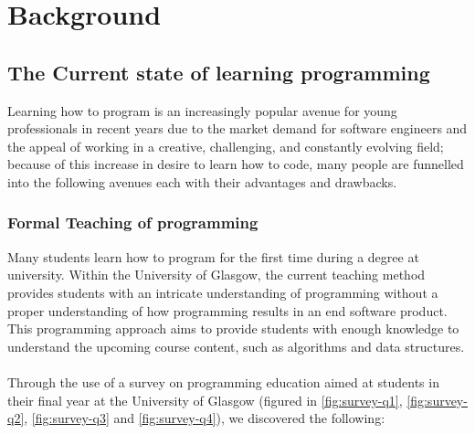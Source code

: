 \documentclass{l4proj}
\begin{document}
\chapter{Background} %

\section{The Current state of learning programming}

Learning how to program is an increasingly popular avenue for young professionals in recent years due to the market demand for software engineers and the appeal of working in a creative, challenging, and constantly evolving field; because of this increase in desire to learn how to code, many people are funnelled into the following avenues each with their advantages and drawbacks.

\subsection{Formal Teaching of programming}
Many students learn how to program for the first time during a degree at university. Within the University of Glasgow, the current teaching method provides students with an intricate understanding of programming without a proper understanding of how programming results in an end software product. This programming approach aims to provide students with enough knowledge to understand the upcoming course content, such as algorithms and data structures.
\\ \\
Through the use of a survey on programming education aimed at students in their final year at the University of Glasgow (figured in \ref{fig:survey-q1}, \ref{fig:survey-q2}, \ref{fig:survey-q3} and \ref{fig:survey-q4}), we discovered the following:
\end{document}
